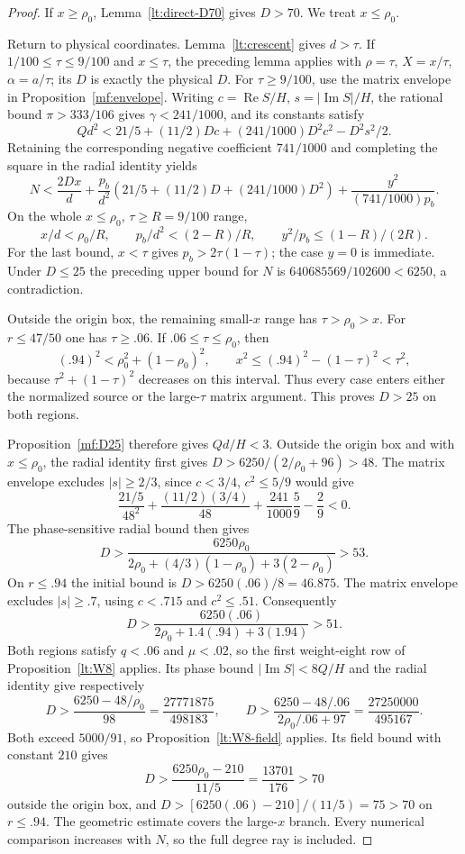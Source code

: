 \documentclass[11pt,reqno]{amsart}
\numberwithin{equation}{section}
\theoremstyle{definition}
\theoremstyle{remark}
\renewcommand{\Re}{\operatorname{Re}}
\renewcommand{\Im}{\operatorname{Im}}
\begin{document}
\begin{proof}
If $x\ge\rho_0$, Lemma~\ref{lt:direct-D70} gives $D>70$.
We treat $x\le\rho_0$.

Return to physical coordinates. Lemma~\ref{lt:crescent} gives
$d>\tau$. If $1/100\le\tau\le9/100$ and $x\le\tau$, the
preceding lemma applies with $\rho=\tau$, $X=x/\tau$,
$\alpha=a/\tau$; its $D$ is exactly the physical $D$.
For $\tau\ge9/100$, use the matrix envelope in
Proposition~\ref{mf:envelope}. Writing $c=\Re S/H$,
$s=|\Im S|/H$, the rational bound $\pi>333/106$ gives
$\gamma<241/1000$, and its constants satisfy
\[
 Qd^2<21/5+(11/2)Dc+(241/1000)D^2c^2-D^2s^2/2.
\]
Retaining the corresponding negative coefficient $741/1000$ and
completing the square in the radial identity yields
\[
 N<\frac{2Dx}{d}+\frac{p_b}{d^2}
       \left(21/5+(11/2)D+(241/1000)D^2\right)
       +\frac{y^2}{(741/1000)p_b}.
\]
On the whole $x\le\rho_0$, $\tau\ge R=9/100$ range,
\[
 x/d<\rho_0/R,\qquad p_b/d^2<(2-R)/R,\qquad
 y^2/p_b\le(1-R)/(2R).
\]
For the last bound, $x<\tau$ gives $p_b>2\tau(1-\tau)$;
the case $y=0$ is immediate. Under $D\le25$ the preceding upper
bound for $N$ is $640685569/102600<6250$, a contradiction.

Outside the origin box, the remaining small-$x$ range has
$\tau>\rho_0>x$. For $r\le47/50$ one has $\tau\ge.06$.
If $.06\le\tau\le\rho_0$, then
\[
 (.94)^2<\rho_0^2+(1-\rho_0)^2,\qquad
 x^2\le(.94)^2-(1-\tau)^2<\tau^2,
\]
because $\tau^2+(1-\tau)^2$ decreases on this interval.
Thus every case enters either the normalized source or the
large-$\tau$ matrix argument. This proves $D>25$ on both regions.

Proposition~\ref{mf:D25} therefore gives $Qd/H<3$.
Outside the origin box and with $x\le\rho_0$, the radial identity
first gives $D>6250/(2/\rho_0+96)>48$. The matrix envelope excludes
$|s|\ge2/3$, since $c<3/4$, $c^2\le5/9$ would give
\[
 \frac{21/5}{48^2}+\frac{(11/2)(3/4)}{48}
       +\frac{241}{1000}\frac59-\frac29<0.
\]
The phase-sensitive radial bound then gives
\[
 D>\frac{6250\rho_0}{2\rho_0+(4/3)(1-\rho_0)+3(2-\rho_0)}>53.
\]
On $r\le.94$ the initial bound is $D>6250(.06)/8=46.875$.
The matrix envelope excludes $|s|\ge.7$, using $c<.715$ and
$c^2\le.51$. Consequently
\[
 D>\frac{6250(.06)}{2\rho_0+1.4(.94)+3(1.94)}>51.
\]
Both regions satisfy $q<.06$ and $\mu<.02$, so the first
weight-eight row of Proposition~\ref{lt:W8} applies.
Its phase bound $|\Im S|<8Q/H$ and the radial identity give respectively
\[
 D>\frac{6250-48/\rho_0}{98}
   =\frac{27771875}{498183},\qquad
 D>\frac{6250-48/.06}{2\rho_0/.06+97}
   =\frac{27250000}{495167}.
\]
Both exceed $5000/91$, so Proposition~\ref{lt:W8-field} applies.
Its field bound with constant $210$ gives
\[
 D>\frac{6250\rho_0-210}{11/5}=\frac{13701}{176}>70
\]
outside the origin box, and $D>[6250(.06)-210]/(11/5)=75>70$
on $r\le.94$. The geometric estimate covers the large-$x$ branch.
Every numerical comparison increases with $N$, so the full degree
ray is included.
\end{proof}
\end{document}
